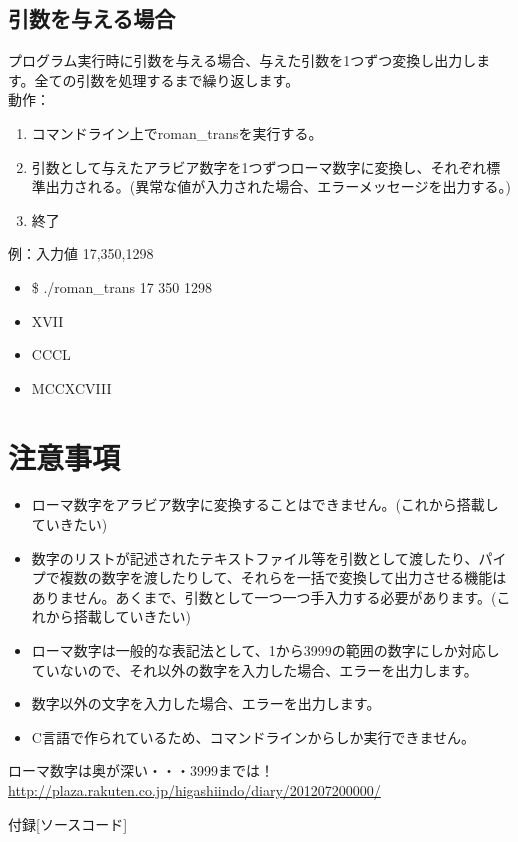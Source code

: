 \documentclass{jsarticle}
\begin{document}
{\newpage
\subsection{引数を与える場合}
プログラム実行時に引数を与える場合、与えた引数を1つずつ変換し出力します。全ての引数を処理するまで繰り返します。\\

動作：
\begin{enumerate}
  \item コマンドライン上でroman\_transを実行する。
  \item 引数として与えたアラビア数字を1つずつローマ数字に変換し、それぞれ標準出力される。(異常な値が入力された場合、エラーメッセージを出力する。) 
  \item 終了\\
\end{enumerate}

例：入力値 17,350,1298
\begin{itemize}
\item[] \$ ./roman\_trans 17 350 1298
\item[] XVII
\item[] CCCL
\item[] MCCXCVIII
\end{itemize}

\section{注意事項}

\begin{itemize}
  \item ローマ数字をアラビア数字に変換することはできません。(これから搭載していきたい)
  \item 数字のリストが記述されたテキストファイル等を引数として渡したり、パイプで複数の数字を渡したりして、それらを一括で変換して出力させる機能はありません。あくまで、引数として一つ一つ手入力する必要があります。(これから搭載していきたい)
  \item ローマ数字は一般的な表記法として、1から3999の範囲の数字にしか対応していない\cite{roman_num}ので、それ以外の数字を入力した場合、エラーを出力します。
  \item 数字以外の文字を入力した場合、エラーを出力します。
  \item C言語で作られているため、コマンドラインからしか実行できません。  
\end{itemize}

\begin{thebibliography}{9}
  ローマ数字は奥が深い・・・3999までは！ \url{http://plaza.rakuten.co.jp/higashiindo/diary/201207200000/}
\end{thebibliography}

\newpage
付録[ソースコード]
}
\end{document}
